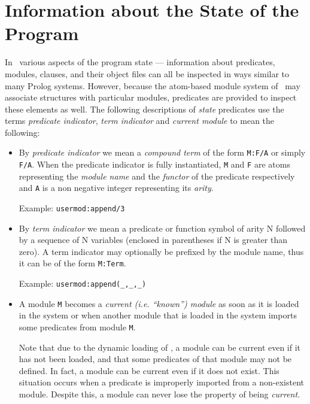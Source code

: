 \section{Information about the State of the Program} \label{State}
 

In \ourprolog\ various aspects of the program state --- information about 
predicates, modules, clauses, and their object files can all be inspected 
in ways similar to many Prolog systems.  However, because the atom-based 
module system of \ourprolog\ may associate structures with particular 
modules, predicates are provided to inspect these elements as well.  
The following descriptions of {\em state} predicates use the terms 
{\em predicate indicator}, {\em term indicator} and {\em current module}
to mean the following:
\begin{itemize}
\item By {\em predicate indicator}  we mean a
      {\em compound term} of the form {\tt M:F/A} or simply {\tt F/A}.
      When the predicate indicator is fully instantiated, {\tt M} and {\tt F}
      are atoms representing the {\em module name} and the {\em functor} 
      of the predicate respectively and {\tt A} is a non negative integer 
      representing its {\em arity}.

      Example: {\tt usermod:append/3}
\item By {\em term indicator}  we mean a predicate or
      function symbol of arity N followed by a sequence of N variables
      (enclosed in parentheses if N is greater than zero).  A term indicator
      may optionally be prefixed by the module name, thus it can be of the
      form {\tt M:Term}.

      Example: {\tt usermod:append(\_,\_,\_)}
\item A module {\tt M} becomes a {\em current (i.e. ``known'') module} as
      soon as it is loaded in the system or when another module that is
      loaded in the system imports some predicates from module {\tt M}.

      Note that due to the dynamic loading of \ourprolog, a module can be 
      current even if it has not been loaded, and that some predicates of 
      that module may not be defined. In fact, a module can be current even
      if it does not exist.  This situation occurs when a predicate is 
      improperly imported from a non-existent module.  Despite this, 
      a module can never lose the property of being {\em current}.
\end{itemize}

